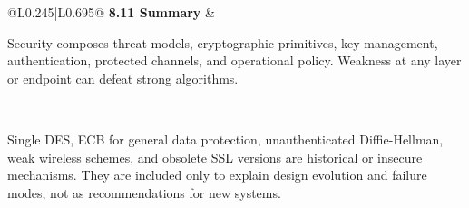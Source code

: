 \documentclass[10pt,letterpaper]{article}
\begin{document}
\begin{longtable}{@{}L{0.245\textwidth}|L{0.695\textwidth}@{}}
\textbf{8.11 Summary} & \begin{minipage}[t]{\linewidth}\raggedright Security composes threat models, cryptographic primitives, key management, authentication, protected channels, and operational policy. Weakness at any layer or endpoint can defeat strong algorithms.\end{minipage} \\ \hline
\end{longtable}

\begin{legacybox}Single DES, ECB for general data protection, unauthenticated Diffie-Hellman, weak wireless schemes, and obsolete SSL versions are historical or insecure mechanisms. They are included only to explain design evolution and failure modes, not as recommendations for new systems.\end{legacybox}

\end{document}

